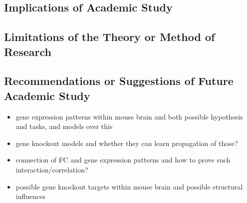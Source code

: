 \documentclass[]{article}
\begin{document}
\subsection*{Implications of Academic Study}
\subsection*{Limitations of the Theory or Method of Research}
\subsection*{Recommendations or Suggestions of Future Academic Study}

\begin{itemize}
	\item gene expression patterns within mouse brain and both possible hypothesis and tasks, and models over this
	\item gene knockout models and whether they can learn propagation of those?
	\item connection of FC and gene expression patterns and how to prove such interaction/correlation?
	\item possible gene knockout targets within mouse brain and possible structural influences
\end{itemize}


\newpage



\newpage

\appendix
\end{document}
